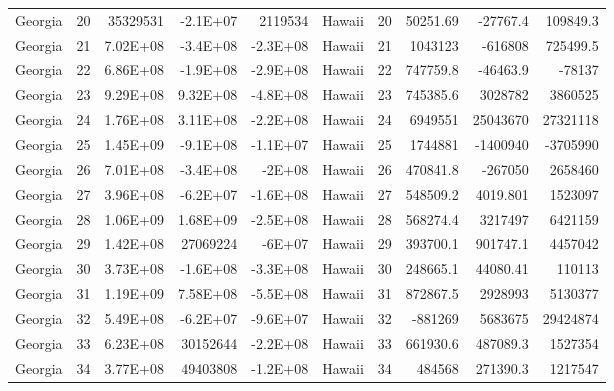 \begin{landscape}
\begin{singlespace}
\begin{longtable}{lrrrr|lrrrr}
		Georgia &  20 & 35329531 & -2.1E+07 & 2119534 & Hawaii &  20 & 50251.69 & -27767.4 & 109849.3 \\
		Georgia &  21 & 7.02E+08 & -3.4E+08 & -2.3E+08 & Hawaii &  21 & 1043123 & -616808 & 725499.5 \\
		Georgia &  22 & 6.86E+08 & -1.9E+08 & -2.9E+08 & Hawaii &  22 & 747759.8 & -46463.9 & -78137 \\
		Georgia &  23 & 9.29E+08 & 9.32E+08 & -4.8E+08 & Hawaii &  23 & 745385.6 & 3028782 & 3860525 \\
		Georgia &  24 & 1.76E+08 & 3.11E+08 & -2.2E+08 & Hawaii &  24 & 6949551 & 25043670 & 27321118 \\
		Georgia &  25 & 1.45E+09 & -9.1E+08 & -1.1E+07 & Hawaii &  25 & 1744881 & -1400940 & -3705990 \\
		Georgia &  26 & 7.01E+08 & -3.4E+08 & -2E+08 & Hawaii &  26 & 470841.8 & -267050 & 2658460 \\
		Georgia &  27 & 3.96E+08 & -6.2E+07 & -1.6E+08 & Hawaii &  27 & 548509.2 & 4019.801 & 1523097 \\
		Georgia &  28 & 1.06E+09 & 1.68E+09 & -2.5E+08 & Hawaii &  28 & 568274.4 & 3217497 & 6421159 \\
		Georgia &  29 & 1.42E+08 & 27069224 & -6E+07 & Hawaii &  29 & 393700.1 & 901747.1 & 4457042 \\
		Georgia &  30 & 3.73E+08 & -1.6E+08 & -3.3E+08 & Hawaii &  30 & 248665.1 & 44080.41 & 110113 \\
		Georgia &  31 & 1.19E+09 & 7.58E+08 & -5.5E+08 & Hawaii &  31 & 872867.5 & 2928993 & 5130377 \\
		Georgia &  32 & 5.49E+08 & -6.2E+07 & -9.6E+07 & Hawaii &  32 & -881269 & 5683675 & 29424874 \\
		Georgia &  33 & 6.23E+08 & 30152644 & -2.2E+08 & Hawaii &  33 & 661930.6 & 487089.3 & 1527354 \\
		Georgia &  34 & 3.77E+08 & 49403808 & -1.2E+08 & Hawaii &  34 & 484568 & 271390.3 & 1217547\\


\end{longtable}
\end{singlespace}
\end{landscape}
